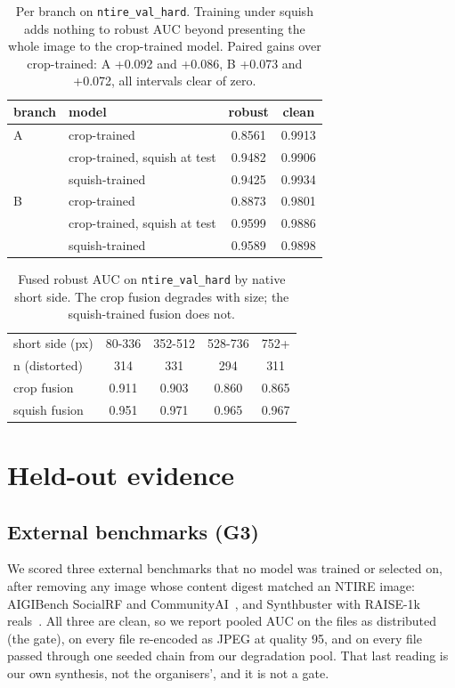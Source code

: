 \documentclass[10pt,twocolumn,letterpaper]{article}
\begin{document}
\begin{table}[t]
\centering
\small
\setlength{\tabcolsep}{4pt}
\begin{tabular}{llcc}
\toprule
branch & model & robust & clean \\
\midrule
A & crop-trained & 0.8561 & 0.9913 \\
  & crop-trained, squish at test & 0.9482 & 0.9906 \\
  & squish-trained & 0.9425 & 0.9934 \\
\midrule
B & crop-trained & 0.8873 & 0.9801 \\
  & crop-trained, squish at test & 0.9599 & 0.9886 \\
  & squish-trained & 0.9589 & 0.9898 \\
\bottomrule
\end{tabular}
\caption{Per branch on \texttt{ntire\_val\_hard}. Training under squish adds
nothing to robust AUC beyond presenting the whole image to the crop-trained
model. Paired gains over crop-trained: A +0.092 and +0.086, B +0.073 and
+0.072, all intervals clear of zero.}
\label{tab:branches}
\end{table}

\begin{table}[t]
\centering
\small
\setlength{\tabcolsep}{4pt}
\begin{tabular}{lcccc}
\toprule
short side (px) & 80-336 & 352-512 & 528-736 & 752+ \\
n (distorted) & 314 & 331 & 294 & 311 \\
\midrule
crop fusion & 0.911 & 0.903 & 0.860 & 0.865 \\
squish fusion & 0.951 & 0.971 & 0.965 & 0.967 \\
\bottomrule
\end{tabular}
\caption{Fused robust AUC on \texttt{ntire\_val\_hard} by native short side.
The crop fusion degrades with size; the squish-trained fusion does not.}
\label{tab:buckets}
\end{table}

\section{Held-out evidence}
\label{sec:heldout}

\subsection{External benchmarks (G3)}

We scored three external benchmarks that no model was trained or selected on,
after removing any image whose content digest matched an NTIRE image:
AIGIBench SocialRF and CommunityAI~\cite{li2025aigibench}, and Synthbuster
with RAISE-1k reals~\cite{bammey2024synthbuster,dangnguyen2015raise}. All three
are clean, so we report pooled AUC on the files as distributed (the gate), on
every file re-encoded as JPEG at quality 95, and on every file passed through
one seeded chain from our degradation pool. That last reading is our own
synthesis, not the organisers', and it is not a gate.
\end{document}
